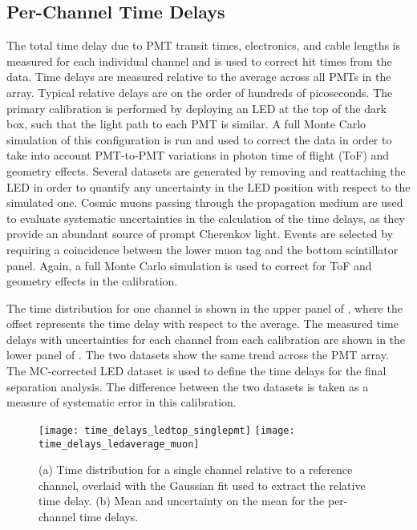 \subsection{Per-Channel Time Delays}\label{s:delay}

The total time delay due to PMT transit times, electronics, and cable lengths is measured for each individual channel and is used to correct hit times from the data. 
Time delays are measured relative to the average across all PMTs in the array. 
Typical relative delays are on the order of hundreds of picoseconds. 
The primary calibration is performed by deploying an LED at the top of the dark box, such that the light path to each PMT is similar.  A full Monte Carlo simulation of this configuration is run and used to correct the data in order to take into account PMT-to-PMT variations in photon time of flight (ToF) and geometry effects.  
Several datasets are generated by removing and reattaching the LED in order to quantify any uncertainty in the LED position with respect to the simulated one. 
Cosmic muons passing through the propagation medium are used to evaluate systematic uncertainties in the calculation of the time delays, as they provide an abundant source of prompt Cherenkov light. 
Events are selected  by requiring a coincidence between the lower muon tag and the bottom scintillator panel. 
Again, a full Monte Carlo simulation is used to correct for ToF and geometry effects in the calibration.  

The time distribution for one channel is shown in the upper panel of , where the offset represents the time delay with respect to the average. 
The measured time delays with uncertainties for each channel from each calibration are shown in the lower panel of .  
The two datasets show the same trend across the PMT array.  
The MC-corrected LED dataset is used to define the time delays for the final separation analysis.
The difference between the two datasets is taken as a measure of  systematic error in this calibration.  

\begin{figure}
	\centering
	\texttt{[image: time\_delays\_ledtop\_singlepmt]}
	\texttt{[image: time\_delays\_ledaverage\_muon]}
	\caption{(a) Time distribution for a single channel relative to a reference channel, overlaid with the Gaussian fit used to extract the relative time delay.  (b) Mean and uncertainty on the mean for the per-channel time delays.}
	\label{fig:time_delay}
\end{figure}


